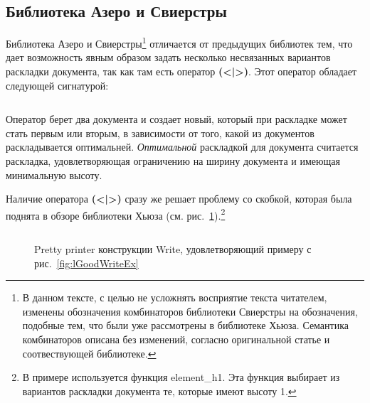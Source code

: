 \newpage

\subsection{Библиотека Азеро и Свиерстры}

Библиотека Азеро и Свиерстры\cite{swierstra}\footnote{
В данном тексте, с целью не усложнять восприятие текста читателем, изменены обозначения комбинаторов библиотеки Свиерстры на обозначения, подобные тем, что были уже рассмотрены в библиотеке Хьюза. Семантика комбинаторов описана без изменений, согласно оригинальной статье и соотвествующей библиотеке.
} отличается от предыдущих библиотек тем, что дает возможность явным образом задать несколько несвязанных вариантов раскладки документа, так как там есть оператор \textbf{(<|>)}. Этот оператор обладает следующей сигнатурой:
\inputminted{haskell}{codes/chooseSw.hs}
Оператор берет два документа и создает новый, который при раскладке может стать первым или вторым, в зависимости от того, какой из документов раскладывается оптимальней. \textit{Оптимальной} раскладкой для документа считается раскладка, удовлетворяющая ограничению на ширину документа и имеющая минимальную высоту.

Наличие оператора \textbf{(<|>)} сразу же решает проблему со скобкой, которая была поднята в обзоре библиотеки Хьюза (см. рис.~\ref{fig:bracketSwierstra}).\footnote{
	В примере используется функция element\_h1. Эта функция выбирает из вариантов раскладки документа те, которые имеют высоту 1.
}

\begin{figure}[h!]
	\inputminted{haskell}{codes/bracketSwierstra.hs}
	\caption{Pretty printer конструкции Write, удовлетворяющий примеру с рис.~\ref{fig:lGoodWriteEx}}
	\label{fig:bracketSwierstra}
\end{figure}

